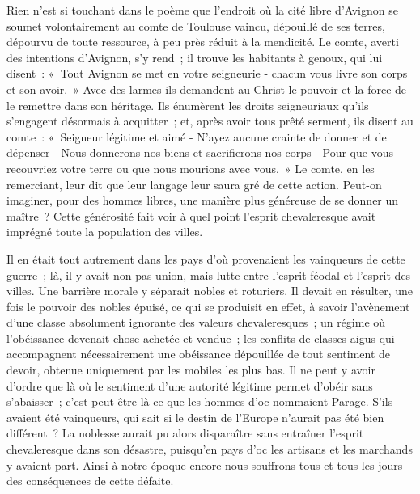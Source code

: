 \documentclass[french,twoside]{book} %
\begin{document}
Rien n'est si touchant dans le poème que l'endroit où la cité libre d'Avignon se soumet volontairement au comte de Toulouse vaincu, dépouillé de ses terres, dépourvu de toute ressource, à peu près réduit à la mendicité. Le comte, averti des intentions d'Avignon, s'y rend ; il trouve les habitants à genoux, qui lui disent : « Tout Avignon se met en votre seigneurie - chacun vous livre son corps et son avoir. » Avec des larmes ils demandent au Christ le pouvoir et la force de le remettre dans son héritage. Ils énumèrent les droits seigneuriaux qu'ils s'engagent désormais à acquitter ; et, après avoir tous prêté serment, ils disent au comte : « Seigneur légitime et aimé - N'ayez aucune crainte de donner et de dépenser - Nous donnerons nos biens et sacrifierons nos corps - Pour que vous recouvriez votre terre ou que nous mourions avec vous. » Le comte, en les remerciant, leur dit que leur langage leur saura gré de cette action. Peut-on imaginer, pour des hommes libres, une manière plus généreuse de se donner un maître ? Cette générosité fait voir à quel point l'esprit chevaleresque avait imprégné toute la population des villes.\par
Il en était tout autrement dans les pays d'où provenaient les vainqueurs de cette guerre ; là, il y avait non pas union, mais lutte entre l'esprit féodal et l'esprit des villes. Une barrière morale y séparait nobles et roturiers. Il devait en résulter, une fois le pouvoir des nobles épuisé, ce qui se produisit en effet, à savoir l'avènement d'une classe absolument ignorante des valeurs chevale­resques ; un régime où l'obéissance devenait chose achetée et vendue ; les conflits de classes aigus qui accompagnent nécessairement une obéissance dépouillée de tout sentiment de devoir, obtenue uniquement par les mobiles les plus bas. Il ne peut y avoir d'ordre que là où le sentiment d'une autorité légitime permet d'obéir sans s'abaisser ; c'est peut-être là ce que les hommes d'oc nommaient Parage. S'ils avaient été vainqueurs, qui sait si le destin de l'Europe n'aurait pas été bien différent ? La noblesse aurait pu alors disparaître sans entraîner l'esprit chevaleresque dans son désastre, puisqu'en pays d'oc les artisans et les marchands y avaient part. Ainsi à notre époque encore nous souffrons tous et tous les jours des conséquences de cette défaite.\par
\end{document}
